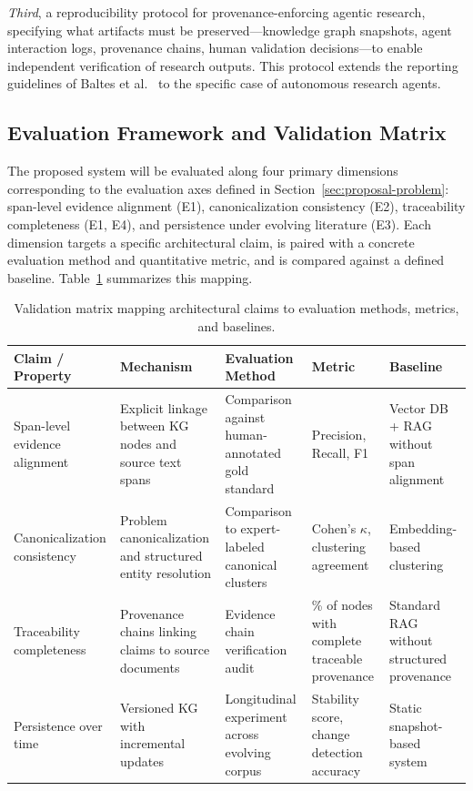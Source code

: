 \emph{Third}, a reproducibility protocol for provenance-enforcing agentic research, specifying what artifacts must be preserved---knowledge graph snapshots, agent interaction logs, provenance chains, human validation decisions---to enable independent verification of research outputs. This protocol extends the reporting guidelines of Baltes et al.~\cite{baltes2025guidelines} to the specific case of autonomous research agents.

\subsection{Evaluation Framework and Validation Matrix}
\label{sec:proposal-evaluation}

The proposed system will be evaluated along four primary dimensions corresponding to the evaluation axes defined in Section~\ref{sec:proposal-problem}: span-level evidence alignment (E1), canonicalization consistency (E2), traceability completeness (E1, E4), and persistence under evolving literature (E3). Each dimension targets a specific architectural claim, is paired with a concrete evaluation method and quantitative metric, and is compared against a defined baseline. Table~\ref{tab:validation-matrix} summarizes this mapping.

\begin{table}[t]
\centering
\caption{Validation matrix mapping architectural claims to evaluation methods, metrics, and baselines.}
\label{tab:validation-matrix}
\small
\begin{tabular}{@{}p{2.6cm}p{3.2cm}p{3.4cm}p{2.8cm}p{3.0cm}@{}}
\toprule
\textbf{Claim / Property} & \textbf{Mechanism} & \textbf{Evaluation Method} & \textbf{Metric} & \textbf{Baseline} \\
\midrule
Span-level evidence alignment &
Explicit linkage between KG nodes and source text spans &
Comparison against human-annotated gold standard &
Precision, Recall, F1 &
Vector DB + RAG without span alignment \\
\addlinespace
Canonicalization consistency &
Problem canonicalization and structured entity resolution &
Comparison to expert-labeled canonical clusters &
Cohen's $\kappa$, clustering agreement &
Embedding-based clustering \\
\addlinespace
Traceability completeness &
Provenance chains linking claims to source documents &
Evidence chain verification audit &
\% of nodes with complete traceable provenance &
Standard RAG without structured provenance \\
\addlinespace
Persistence over time &
Versioned KG with incremental updates &
Longitudinal experiment across evolving corpus &
Stability score, change detection accuracy &
Static snapshot-based system \\
\bottomrule
\end{tabular}
\end{table}

